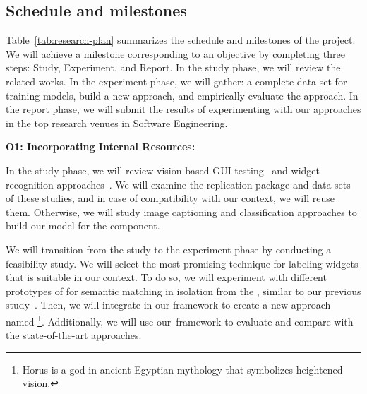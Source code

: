 \subsection{Schedule and milestones}



Table~\ref{tab:research-plan} summarizes the schedule and milestones of the \project project.
We will achieve a milestone corresponding to an objective by completing three steps: Study, Experiment, and Report. 
 In the study phase, we will review the related works.
In the experiment phase, we will gather: a complete data set for training models, build a new \testreuse approach, and empirically evaluate the approach. 
In the report phase, we will submit the results of experimenting with our approaches in  the top research venues in Software Engineering.

\smallskip
\noindent
\textbf{O1: Incorporating Internal Resources:}  

\noindent
In the study phase, we will review vision-based GUI testing~\cite{Hu:appflow:FSE:2018,zhao:Avgust:FSE:2022,YazdaniBanafsheDaragh:DEEPGUI:ASE:2021}  and widget recognition approaches~\cite{white:WidgetDetection:ISSTA:2019,zhu2021widgetrecog}. 
We will examine the replication package and data sets of these studies, and in case of compatibility with our context, we will reuse them. 
Otherwise, we will study image captioning and classification approaches to build our model for the \imagelabeler component.
%

\smallskip
We will transition from the study to the experiment phase by conducting a feasibility study. 
We will select the most promising technique for labeling  widgets that is suitable in our context.  
To do so, we will experiment with different prototypes of \imagelabeler for semantic matching in isolation from the \testreuse,  similar to our previous study~\cite{mariani:SemFinder:ISSTA:2021}. 
Then, we will integrate \imagelabeler in our \tme framework to create a new \testreuse approach named \visiontool\footnote{Horus is a god in ancient Egyptian mythology that symbolizes heightened vision.}.
Additionally, we will use our~\tme framework to evaluate \visiontool and compare with the state-of-the-art \testreuse approaches.

